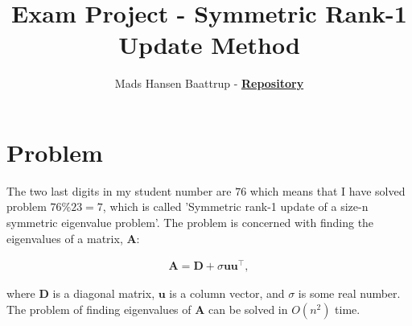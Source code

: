 \documentclass[twocolumn,a4paper, 10pts]{article}
\begin{document}
\title{\vspace{-1.7cm}Exam Project - Symmetric Rank-1 Update Method}
\author{Mads Hansen Baattrup - \href{https://github.com/mads-hb/ppnm-2022}{\textbf{Repository}}}
\maketitle

\section*{Problem}
The two last digits in my student number are $76$ which means that I have solved problem $76\%23=7$, which is called 'Symmetric rank-1 update of a size-n symmetric eigenvalue problem'. The problem is concerned with finding the eigenvalues of a matrix, $\mathbf{A}$:

\begin{align}
\label{eqn:matrix-system}
\mathbf{A}=\mathbf{D}+\sigma \mathbf{u}\mathbf{u}^\intercal,
\end{align}

where $\mathbf{D}$ is a diagonal matrix, $\mathbf{u}$ is a column vector, and $\sigma$ is some real number. The problem of finding eigenvalues of $\mathbf{A}$ can be solved in $O(n^2)$ time.
\end{document}

